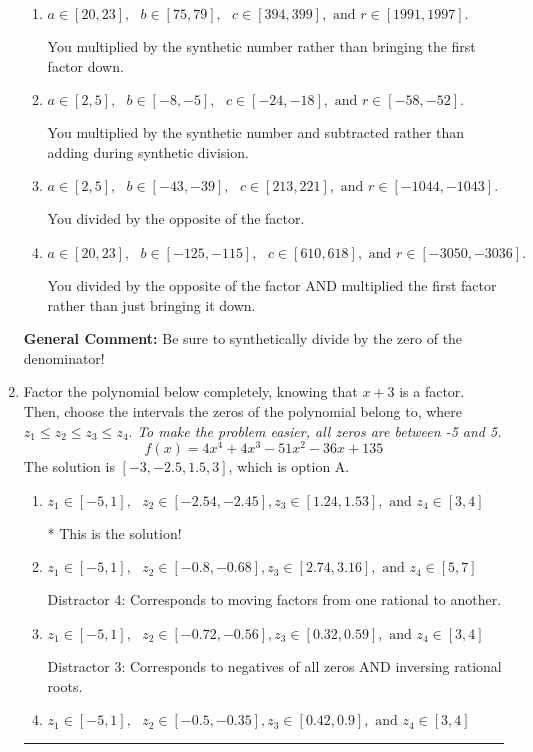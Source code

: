 \documentclass{extbook}[14pt]
\newcommand{\litem}[1]{\item #1

\rule{\textwidth}{0.4pt}}
\begin{document}
\begin{enumerate}
{\begin{enumerate}[label=\Alph*.]
* This is the solution!
\item \( a \in [20, 23], \text{   } b \in [75, 79], \text{   } c \in [394, 399], \text{   and   } r \in [1991, 1997]. \)

 You multiplied by the synthetic number rather than bringing the first factor down.
\item \( a \in [2, 5], \text{   } b \in [-8, -5], \text{   } c \in [-24, -18], \text{   and   } r \in [-58, -52]. \)

 You multiplied by the synthetic number and subtracted rather than adding during synthetic division.
\item \( a \in [2, 5], \text{   } b \in [-43, -39], \text{   } c \in [213, 221], \text{   and   } r \in [-1044, -1043]. \)

 You divided by the opposite of the factor.
\item \( a \in [20, 23], \text{   } b \in [-125, -115], \text{   } c \in [610, 618], \text{   and   } r \in [-3050, -3036]. \)

 You divided by the opposite of the factor AND multiplied the first factor rather than just bringing it down.
\end{enumerate}

\textbf{General Comment:} Be sure to synthetically divide by the zero of the denominator!
}
\litem{
Factor the polynomial below completely, knowing that $x + 3$ is a factor. Then, choose the intervals the zeros of the polynomial belong to, where $z_1 \leq z_2 \leq z_3 \leq z_4$. \textit{To make the problem easier, all zeros are between -5 and 5.}
\[ f(x) = 4x^{4} +4 x^{3} -51 x^{2} -36 x + 135 \]The solution is \( [-3, -2.5, 1.5, 3] \), which is option A.\begin{enumerate}[label=\Alph*.]
\item \( z_1 \in [-5, 1], \text{   }  z_2 \in [-2.54, -2.45], z_3 \in [1.24, 1.53], \text{   and   } z_4 \in [3, 4] \)

* This is the solution!
\item \( z_1 \in [-5, 1], \text{   }  z_2 \in [-0.8, -0.68], z_3 \in [2.74, 3.16], \text{   and   } z_4 \in [5, 7] \)

 Distractor 4: Corresponds to moving factors from one rational to another.
\item \( z_1 \in [-5, 1], \text{   }  z_2 \in [-0.72, -0.56], z_3 \in [0.32, 0.59], \text{   and   } z_4 \in [3, 4] \)

 Distractor 3: Corresponds to negatives of all zeros AND inversing rational roots.
\item \( z_1 \in [-5, 1], \text{   }  z_2 \in [-0.5, -0.35], z_3 \in [0.42, 0.9], \text{   and   } z_4 \in [3, 4] \)


\end{enumerate}}
\end{enumerate}
\end{document}
